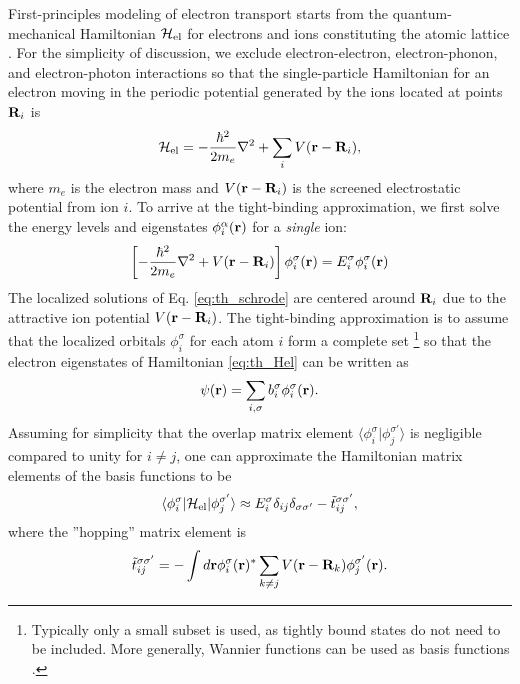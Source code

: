 First-principles modeling of electron transport starts from the quantum-mechanical Hamiltonian $\mathcal{H}_{\textrm{el}}$ for electrons and ions constituting the atomic lattice \cite{ashcroftmermin}. For the simplicity of discussion, we exclude electron-electron, electron-phonon, and electron-photon interactions so that the single-particle Hamiltonian for an electron moving in the periodic potential generated by the ions located at points $\mathbf{R}_i$ is \cite{ashcroftmermin}
\begin{equation}
 \mathcal{H}_{\textrm{el}} = - \frac{\hbar^2}{2m_e} \nabla^2  + \sum_i V(\mathbf{r}-\mathbf{R}_i), \label{eq:th_Hel}
\end{equation}
where $m_e$ is the electron mass and $V(\mathbf{r}-\mathbf{R}_i)$ is the screened electrostatic potential from ion $i$. To arrive at the tight-binding approximation, we first solve the energy levels and eigenstates $\phi_i^{\alpha}(\mathbf{r})$ for a \textit{single} ion:
\begin{equation}
 \left[ - \frac{\hbar^2}{2m_e} \nabla^2  +  V(\mathbf{r}-\mathbf{R}_i) \right] \phi_i^{\sigma} (\mathbf{r}) = E_i^{\sigma} \phi_i^{\sigma}(\mathbf{r}) \label{eq:th_schrode}
\end{equation}
The localized solutions of Eq. \eqref{eq:th_schrode} are centered around $\mathbf{R}_i$ due to the attractive ion potential $V(\mathbf{r}-\mathbf{R}_i)$. The tight-binding approximation is to assume that the localized orbitals $\phi_i^{\sigma}$ for each atom $i$ form a complete set \footnote{Typically only a small subset is used, as tightly bound states do not need to be included. More generally, Wannier functions can be used as basis functions \cite{ashcroftmermin}.} so that the electron eigenstates of Hamiltonian \eqref{eq:th_Hel} can be written as
\begin{equation}
 \psi(\mathbf{r}) = \sum_{i,\sigma} b_i^{\sigma} \phi_{i}^{\sigma}(\mathbf{r}).
\end{equation}
Assuming for simplicity that the overlap matrix element $\langle \phi_i^{\sigma}| \phi_j^{\sigma'} \rangle$ is negligible compared to unity for $i\neq j$, one can approximate the Hamiltonian matrix elements of the basis functions to be
\begin{equation}
 \langle \phi_i^{\sigma} | \mathcal{H}_{\textrm{el}} | \phi_j^{\sigma'} \rangle \approx E_i^{\sigma} \delta_{ij}\delta_{\sigma\sigma'}  - \tilde t_{ij}^{\sigma\sigma'}, \label{eq:th_Helements}
\end{equation}
where the ''hopping'' matrix element is 
\begin{equation}
  \tilde t_{ij}^{\sigma\sigma'} = - \int d\mathbf{r} \phi_i^{\sigma}(\mathbf{r})^*  \sum_{k\neq j} V(\mathbf{r}-\mathbf{R}_k)   \phi_j^{\sigma'}(\mathbf{r}).
\end{equation}
